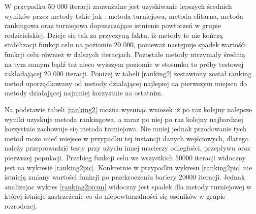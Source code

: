 W przypadku 50 000 iteracji zauważalne jest uzyskiwanie lepszych średnich wyników przez metody takie jak : metoda turniejowa, metoda elitarna, metoda rankingowa oraz turniejowa dopuszczające istnienie powtorzeń w grupie rodzicielskiej. Dzieje się tak za przyczyną faktu, iż metody te nie kończą stabilizacji funkcji celu na poziomie 20 000, ponieważ następuje spadek wartośći funkcji celu również w dalszych iteracjach. Pozostałe metody utrzymały średnią na tym samym bądź też nieco wyższym poziomie w stosunku to próby testowej zakładającej 20 000 iteracji. Poniżej w tabeli \ref{ranking2} zestawiony został ranking metod uporządkowany od metody działającej najlepiej na pierwszym miejscu do metody działającej najmniej korzystnie na ostatnim.

\begin{table}[h!]
\begin{center}
\caption{Ranking metod selekcji na podstawie średniej wartości funkcji celu}
\label{ranking2}
\end{center}
\end{table}

Na podstawie tabeli \ref{ranking2} można wysunąc wniosek iż po raz kolejny nalepsze wyniki uzyskuje metoda rankingowa, a zaraz po niej po raz kolejny najbardziej korzystnie zachowuje się metoda turniejowa. Nie mniej jednak przodowanie tych metod może mieć miejsce w przypadku tej instancji danych wejściowych, dlatego należy przeprowadzić testy przy użyciu innej macierzy odległości, przepływu oraz pierwszej populacji. Przebieg funkcji celu we wszystkich 50000 iteracji widoczny jest na wykresie \ref{ranking2pic}. Konkretnie w przypadku wykresu \ref{ranking2pic} nie istnieją zmiany wartości funkcji po przekroczeniu bariery 20000 iteracji. Jednak analizujac wykres \ref{ranking2picun} widoczny jest spadek dla metody turniejowej w której istnieje zastrzeżenie co do niepowtarzalności się osoników w grupie rozrodczej.

